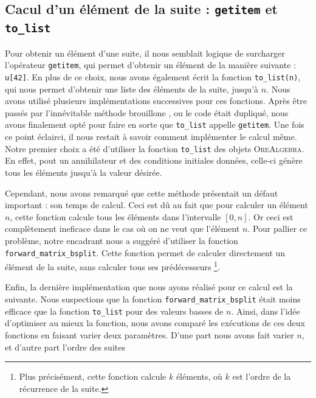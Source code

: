 \documentclass[12pt]{article}
\newlength{\charwidth}
\newcommand{\uline}{\underline{\hspace{2\charwidth}}}
\begin{document}
    \subsection{Cacul d'un élément de la suite : \texttt{\uline getitem\uline } et \texttt{to\_list}}
        \label{sec:getitem}
        Pour obtenir un élément d'une suite, il nous semblait logique de surcharger l'opérateur
        \texttt{\uline getitem\uline }, qui permet d'obtenir un élément de la manière suivante : 
        \texttt{u[42]}. En plus de ce choix, nous avons également écrit la fonction
        \texttt{to\_list(n)}, qui nous permet d'obtenir une liste des éléments de la suite, jusqu'à $n$.
        Nous avons utilisé plusieurs implémentations successives pour ces fonctions.
        Après être passés par l'innévitable \og méthode brouillone \fg, ou le code était dupliqué,
        nous avons finalement opté pour
        faire en sorte que \texttt{to\_list} appelle \texttt{\uline getitem\uline}. Une fois ce point
        éclairci, il nous restait à savoir comment implémenter le calcul même. Notre premier choix
        a été d'utiliser la fonction \texttt{to\_list} des objets \textsc{OreAlgebra}. En effet,
        pout un annihilateur et des conditions initiales données, celle-ci génère tous les éléments
        jusqu'à la valeur désirée.
        \par Cependant, nous avons remarqué que cette méthode présentait un défaut important : son
        temps de calcul. Ceci est dû au fait que pour calculer un élément $n$, cette fonction
        calcule tous les éléments dans l'intervalle $[0,n]$. Or ceci est complètement ineficace
        dans le cas où on ne veut que l'élément $n$. Pour pallier ce problème, notre encadrant nous 
        a suggéré d'utiliser la fonction \texttt{forward\_matrix\_bsplit}.
        Cette fonction permet de calculer directement un élément de la suite, sans calculer tous ses
        prédécesseurs
        \footnote{Plus précisément, cette fonction calcule $k$ éléments, où  $k$ est l'ordre de la
        récurrence de la suite.}.
        \par Enfin, la dernière implémentation que nous ayons réalisé pour ce calcul est la suivante.
        Nous suspections que la fonction \texttt{forward\_matrix\_bsplit} était moins efficace que la
        fonction \texttt{to\_list} pour des valeurs basses de $n$. Ainsi, dans l'idée d'optimiser au
        mieux la fonction, nous avons comparé les exécutions de ces deux fonctions en faisant varier
        deux paramètres. D'une part nous avons fait varier $n$, et d'autre part l'ordre des suites
\end{document}
